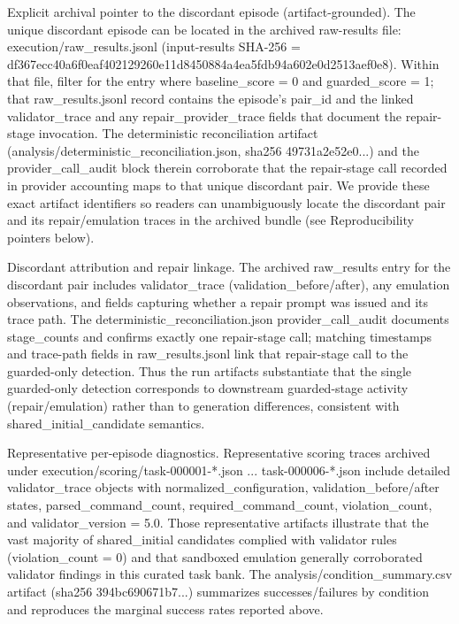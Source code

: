 \documentclass[conference]{IEEEtran}
\begin{document}
Explicit archival pointer to the discordant episode (artifact-grounded). The unique discordant episode can be located in the archived raw-results file: execution/raw\_results.jsonl (input-results SHA-256 = df367ecc\allowbreak{}40a6f0ea\allowbreak{}f4021292\allowbreak{}60e11d84\allowbreak{}50884a4e\allowbreak{}a5fdb94a\allowbreak{}602e0d25\allowbreak{}13aef0e8). Within that file, filter for the entry where baseline\_score = 0 and guarded\_score = 1; that raw\_results.jsonl record contains the episode's pair\_id and the linked validator\_trace and any repair\_provider\_trace fields that document the repair-stage invocation. The deterministic reconciliation artifact (analysis/deterministic\_reconciliation.json, sha256 49731a2e52e0...) and the provider\_call\_audit block therein corroborate that the repair-stage call recorded in provider accounting maps to that unique discordant pair. We provide these exact artifact identifiers so readers can unambiguously locate the discordant pair and its repair/emulation traces in the archived bundle (see Reproducibility pointers below).

Discordant attribution and repair linkage. The archived raw\_results entry for the discordant pair includes validator\_trace (validation\_before/after), any emulation observations, and fields capturing whether a repair prompt was issued and its trace path. The deterministic\_reconciliation.json provider\_call\_audit documents stage\_counts and confirms exactly one repair-stage call; matching timestamps and trace-path fields in raw\_results.jsonl link that repair-stage call to the guarded-only detection. Thus the run artifacts substantiate that the single guarded-only detection corresponds to downstream guarded-stage activity (repair/emulation) rather than to generation differences, consistent with shared\_initial\_candidate semantics.

Representative per-episode diagnostics. Representative scoring traces archived under execution/scoring/task-000001-*.json ... task-000006-*.json include detailed validator\_trace objects with normalized\_configuration, validation\_before/after states, parsed\_command\_count, required\_command\_count, violation\_count, and validator\_version = 5.0. Those representative artifacts illustrate that the vast majority of shared\_initial candidates complied with validator rules (violation\_count = 0) and that sandboxed emulation generally corroborated validator findings in this curated task bank. The analysis/condition\_summary.csv artifact (sha256 394bc690671b7...) summarizes successes/failures by condition and reproduces the marginal success rates reported above.
\end{document}

